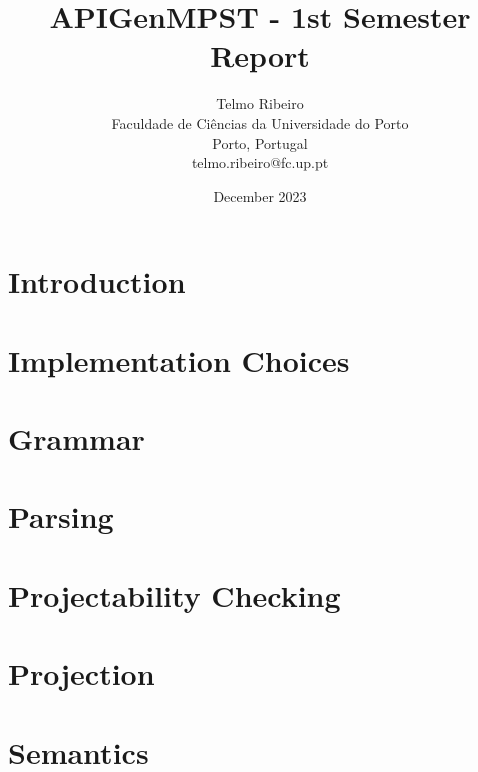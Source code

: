\documentclass{article}
\begin{document}
\title {
    \textbf{APIGenMPST -  1st Semester Report}
}

\author {
    Telmo Ribeiro\\
    Faculdade de Ciências da Universidade do Porto\\
    Porto, Portugal\\
    telmo.ribeiro@fc.up.pt
}
\date{December 2023}

\maketitle
\section{Introduction}

\pagebreak

\maketitle
\section{Implementation Choices}

\pagebreak

\maketitle
\section{Grammar}

\pagebreak

\maketitle
\section{Parsing}

\pagebreak

\maketitle
\section{Projectability Checking}

\pagebreak

\maketitle
\section{Projection}

\pagebreak

\maketitle
\section{Semantics}

\pagebreak

\nocite{scalas2019less}


\end{document}
